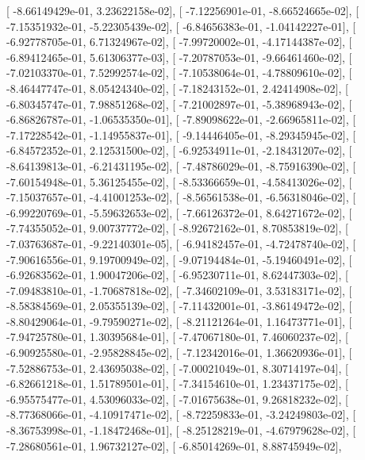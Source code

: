 \documentclass{article}
\begin{document}
       [ -8.66149429e-01,   3.23622158e-02],
       [ -7.12256901e-01,  -8.66524665e-02],
       [ -7.15351932e-01,  -5.22305439e-02],
       [ -6.84656383e-01,  -1.04142227e-01],
       [ -6.92778705e-01,   6.71324967e-02],
       [ -7.99720002e-01,  -4.17144387e-02],
       [ -6.89412465e-01,   5.61306377e-03],
       [ -7.20787053e-01,  -9.66461460e-02],
       [ -7.02103370e-01,   7.52992574e-02],
       [ -7.10538064e-01,  -4.78809610e-02],
       [ -8.46447747e-01,   8.05424340e-02],
       [ -7.18243152e-01,   2.42414908e-02],
       [ -6.80345747e-01,   7.98851268e-02],
       [ -7.21002897e-01,  -5.38968943e-02],
       [ -6.86826787e-01,  -1.06535350e-01],
       [ -7.89098622e-01,  -2.66965811e-02],
       [ -7.17228542e-01,  -1.14955837e-01],
       [ -9.14446405e-01,  -8.29345945e-02],
       [ -6.84572352e-01,   2.12531500e-02],
       [ -6.92534911e-01,  -2.18431207e-02],
       [ -8.64139813e-01,  -6.21431195e-02],
       [ -7.48786029e-01,  -8.75916390e-02],
       [ -7.60154948e-01,   5.36125455e-02],
       [ -8.53366659e-01,  -4.58413026e-02],
       [ -7.15037657e-01,  -4.41001253e-02],
       [ -8.56561538e-01,  -6.56318046e-02],
       [ -6.99220769e-01,  -5.59632653e-02],
       [ -7.66126372e-01,   8.64271672e-02],
       [ -7.74355052e-01,   9.00737772e-02],
       [ -8.92672162e-01,   8.70853819e-02],
       [ -7.03763687e-01,  -9.22140301e-05],
       [ -6.94182457e-01,  -4.72478740e-02],
       [ -7.90616556e-01,   9.19700949e-02],
       [ -9.07194484e-01,  -5.19460491e-02],
       [ -6.92683562e-01,   1.90047206e-02],
       [ -6.95230711e-01,   8.62447303e-02],
       [ -7.09483810e-01,  -1.70687818e-02],
       [ -7.34602109e-01,   3.53183171e-02],
       [ -8.58384569e-01,   2.05355139e-02],
       [ -7.11432001e-01,  -3.86149472e-02],
       [ -8.80429064e-01,  -9.79590271e-02],
       [ -8.21121264e-01,   1.16473771e-01],
       [ -7.94725780e-01,   1.30395684e-01],
       [ -7.47067180e-01,   7.46060237e-02],
       [ -6.90925580e-01,  -2.95828845e-02],
       [ -7.12342016e-01,   1.36620936e-01],
       [ -7.52886753e-01,   2.43695038e-02],
       [ -7.00021049e-01,   8.30714197e-04],
       [ -6.82661218e-01,   1.51789501e-01],
       [ -7.34154610e-01,   1.23437175e-02],
       [ -6.95575477e-01,   4.53096033e-02],
       [ -7.01675638e-01,   9.26818232e-02],
       [ -8.77368066e-01,  -4.10917471e-02],
       [ -8.72259833e-01,  -3.24249803e-02],
       [ -8.36753998e-01,  -1.18472468e-01],
       [ -8.25128219e-01,  -4.67979628e-02],
       [ -7.28680561e-01,   1.96732127e-02],
       [ -6.85014269e-01,   8.88745949e-02],
\end{document}
